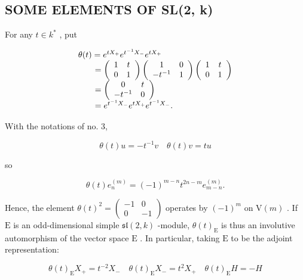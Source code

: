 \subsection{SOME ELEMENTS OF SL(2, k)}

For any \(t\in k^{*}\) , put

\[
\begin{array}{l} \theta (t) = e ^ {t X _ {+}} e ^ {t ^ {- 1} X _ {-}} e ^ {t X _ {+}} \\ \qquad = \left( \begin{array}{c c} 1 & t \\ 0 & 1 \end{array} \right) \left( \begin{array}{c c} 1 & 0 \\ - t ^ {- 1} & 1 \end{array} \right) \left( \begin{array}{c c} 1 & t \\ 0 & 1 \end{array} \right) \\ \qquad = \left( \begin{array}{c c} 0 & t \\ - t ^ {- 1} & 0 \end{array} \right) \\ \qquad = e ^ {t ^ {- 1} X _ {-}} e ^ {t X _ {+}} e ^ {t ^ {- 1} X _ {-}}. \end{array}
\]

With the notations of no. 3,

\[
\theta (t) u = - t ^ {- 1} v \quad \theta (t) v = t u
\]

so

\[
\theta (t) e _ {n} ^ {(m)} = (- 1) ^ {m - n} t ^ {2 n - m} e _ {m - n} ^ {(m)}.\tag{4}
\]

Hence, the element \(\theta(t)^2 = \left( \begin{array}{cc} -1 & 0 \\ 0 & -1 \end{array} \right)\) operates by \((-1)^m\) on \(\mathrm{V}(m)\) . If \(\mathrm{E}\) is an odd-dimensional simple \(\mathfrak{sl}(2,k)\) -module, \(\theta(t)_{\mathrm{E}}\) is thus an involutive automorphism of the vector space \(\mathrm{E}\) . In particular, taking \(\mathrm{E}\) to be the adjoint representation:

\[
\theta (t) _ {\mathrm{E}} X _ {+} = t ^ {- 2} X _ {-} \quad \theta (t) _ {\mathrm{E}} X _ {-} = t ^ {2} X _ {+} \quad \theta (t) _ {\mathrm{E}} H = - H\tag{5}
\]

